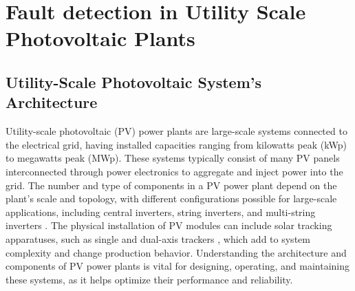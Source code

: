 \chapter{Fault detection in Utility Scale Photovoltaic Plants} \label{chap:chap2}


\section{Utility-Scale Photovoltaic System's Architecture}

Utility-scale photovoltaic (PV) power plants are large-scale systems connected to the electrical grid, having installed capacities ranging from kilowatts peak (kWp) to megawatts peak (MWp). These systems typically consist of many PV panels interconnected through power electronics to aggregate and inject power into the grid. The number and type of components in a PV power plant depend on the plant's scale and topology, with different configurations possible for large-scale applications, including central inverters, string inverters, and multi-string inverters \cite{lspv}. The physical installation of PV modules can include solar tracking apparatuses, such as single and dual-axis trackers \cite{Mourad2022}, which add to system complexity and change production behavior. Understanding the architecture and components of PV power plants is vital for designing, operating, and maintaining these systems, as it helps optimize their performance and reliability.

